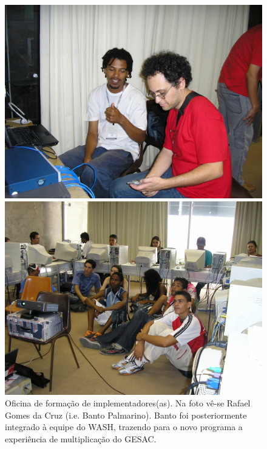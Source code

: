 \captionsetup{format=plain}
\begin{figure}[htb]

\centering


\begin{minipage}[b]{0.4\linewidth}
        \centering
                \includegraphics[width=1.0\linewidth]{../../../imagens/bantorafa.JPG}
                \caption{Oficina de formação de implementadores(as). Na foto vê-se Rafael Gomes da Cruz (i.e. Banto Palmarino). Banto foi posteriormente integrado à equipe do WASH, trazendo para o novo programa a experiência de multiplicação do GESAC.}
                \label{d2d74ac61c1b95a746858e8420d24348e1b48f51}
\end{minipage}%
\hspace{0.5cm}
\begin{minipage}[b]{0.4\linewidth}
        \centering
                \includegraphics[width=1.0\linewidth]{../../../imagens/oficinalac.JPG}

\end{minipage}
\end{figure}

